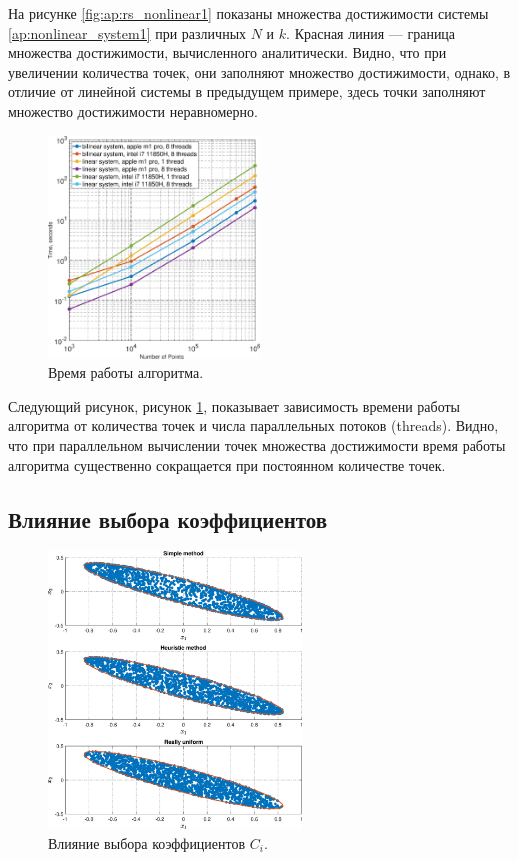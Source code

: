 \documentclass[../main.tex]{subfiles}
\begin{document}
 На рисунке \ref{fig:ap:rs_nonlinear1} показаны множества достижимости системы \eqref{ap:nonlinear_system1} при различных $N$ и $k$.
 Красная линия --- граница множества достижимости, вычисленного аналитически.
 Видно, что при увеличении количества точек, они заполняют множество достижимости, однако, в отличие от линейной системы в предыдущем примере, здесь точки заполняют множество достижимости неравномерно.
 
 \begin{figure}[ht]
 	\centering
 	\includegraphics[width=0.5\textwidth]{images/time_complexity.eps}
 	\caption{Время работы алгоритма.}
 	\label{fig:ap:timings}
 \end{figure}

 Следующий рисунок, рисунок \ref{fig:ap:timings}, показывает зависимость времени работы алгоритма от количества точек и числа параллельных потоков (threads).
 Видно, что при параллельном вычислении точек множества достижимости время работы алгоритма существенно сокращается при постоянном количестве точек.

 \subsection{Влияние выбора коэффициентов }
 
 \begin{figure}[ht]
 	\centering
 	\includegraphics[width=0.6\textwidth]{images/three_linear_system_sets.eps}
 	\caption{Влияние выбора коэффициентов $C_i$.}
 	\label{fig:ap:coeffs_RS}
 \end{figure}
 
\end{document}
